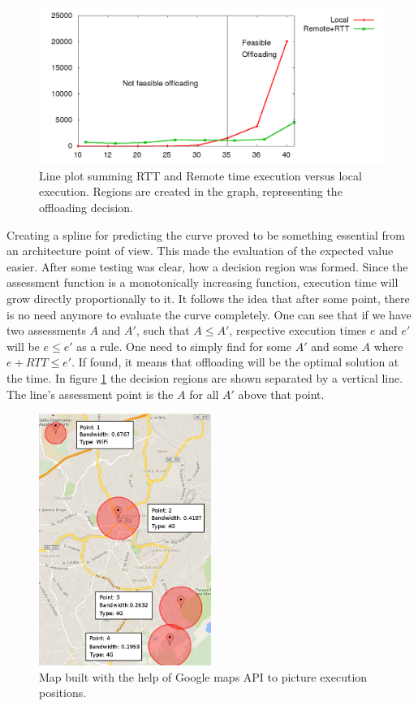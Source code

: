 \documentclass[10pt, conference, letterpaper]{IEEEtran}
\begin{document}
\begin{figure}[!t]
  \centering
  \includegraphics[width=1\textwidth]{plots/threshold/executions.png}
  \caption{Line plot summing RTT and Remote time execution versus local execution. Regions are created in the graph, representing the offloading decision.}
  \label{fig:graphregions}
\end{figure}

Creating a spline for predicting the curve proved to be something essential from an architecture point of view. This made the evaluation of the expected value easier. After some testing was clear, how a decision region was formed. Since the assessment function is a monotonically increasing function, execution time will grow directly proportionally to it. It follows the idea that after some point, there is no need anymore to evaluate the curve completely. One can see that if we have two assessments $A$ and $A'$, such that $A \leq A'$, respective execution times $e$ and $e'$ will be $e \leq e'$ as a rule. One need to simply find for some $A'$ and some $A$ where $e + RTT \leq e'$. If found, it means that offloading will be the optimal solution at the time. In figure \ref{fig:graphregions} the decision regions are shown separated by a vertical line. The line's assessment point is the $A$ for all $A'$ above that point.

\begin{figure}[!t]
  \centering
  \includegraphics[width=0.5\textwidth]{plots/map/map-plot.png}
  \caption{Map built with the help of Google maps API to picture execution positions.}
  \label{fig:mapplot}
\end{figure}
\end{document}
